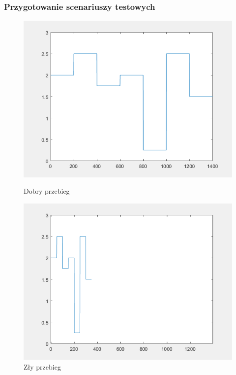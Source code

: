 \begin{frame}
    \frametitle{Przygotowanie scenariuszy testowych}
    \begin{figure}[!tbp]
      \centering
      \begin{minipage}[b]{0.4\textwidth}
        \includegraphics[scale = 0.35]{img/dobry_przebieg.PNG}
        \caption*{Dobry przebieg}
      \end{minipage}
      \hfill
      \begin{minipage}[b]{0.4\textwidth}
        \includegraphics[scale = 0.35]{img/zly_przebieg.PNG}
        \caption*{Zły przebieg}
      \end{minipage}
    \end{figure}
\end{frame}

